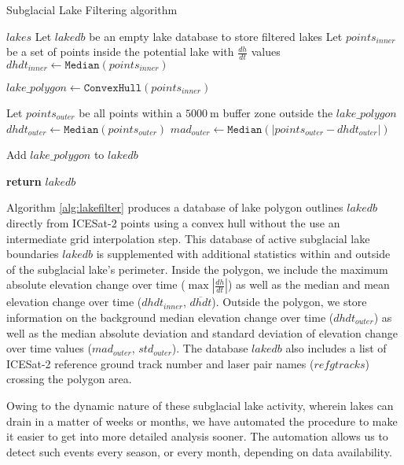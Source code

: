 \begin{algorithm}
  \caption{Subglacial Lake Filtering algorithm}\label{alg:lakefilter}
  \begin{algorithmic}
      \Require $lakes$
      \State Let $lakedb$ be an empty lake database to store filtered lakes
        \State Let $points_{inner}$ be a set of points inside the potential lake with $\frac{dh}{dt}$ values
        \State $dhdt_{inner} \gets \texttt{Median}(points_{inner})$

        \State $lake\_polygon \gets \texttt{ConvexHull}(points_{inner})$

        \State Let $points_{outer}$ be all points within a $\SI{5000}{\metre}$ buffer zone outside the $lake\_polygon$
        \State $dhdt_{outer} \gets \texttt{Median}(points_{outer})$
        \State $mad_{outer} \gets \texttt{Median}(\lvert points_{outer} - dhdt_{outer} \rvert)$  %

          \State Add $lake\_polygon$ to $lakedb$
        \EndIf

      \EndFor
    \State \textbf{return} $lakedb$
  \end{algorithmic}
\end{algorithm}

Algorithm \ref{alg:lakefilter} produces a database of lake polygon outlines $lakedb$ directly from ICESat-2 points using a convex hull \citep{Barberquickhullalgorithmconvex1996} without the use an intermediate grid interpolation step.
This database of active subglacial lake boundaries $lakedb$ is supplemented with additional statistics within and outside of the subglacial lake's perimeter.
Inside the polygon, we include the maximum absolute elevation change over time ($\max |\frac{dh}{dt}|$) as well as the median and mean elevation change over time ($dhdt_{inner}$, $\overline{dhdt}$).
Outside the polygon, we store information on the background median elevation change over time ($dhdt_{outer}$) as well as the median absolute deviation and standard deviation of elevation change over time values ($mad_{outer}$, $std_{outer}$).
The database $lakedb$ also includes a list of ICESat-2 reference ground track number and laser pair names ($refgtracks$) crossing the polygon area.

Owing to the dynamic nature of these subglacial lake activity, wherein lakes can drain in a matter of weeks or months, we have automated the procedure to make it easier to get into more detailed analysis sooner.
The automation allows us to detect such events every season, or every month, depending on data availability.

